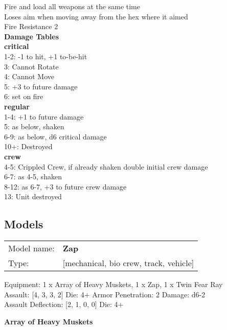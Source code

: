 Fire and load all weapons at the same time\\ 
Loses aim when moving away from the hex where it aimed\\ 
Fire Resistance 2\\ 



{\bf Damage Tables} \\
 {\bf critical } \\
1-2: -1 to hit, +1 to-be-hit \\
3: Cannot Rotate \\
4: Cannot Move \\
5: +3 to future damage \\
6: set on fire \\
 {\bf regular } \\
1-4: +1 to future damage \\
5: as below, shaken \\
6-9: as below, d6 critical damage \\
10+: Destroyed \\
 {\bf crew } \\
4-5: Crippled Crew, if already shaken double initial crew damage \\
6-7: as 4-5, shaken \\
8-12: as 6-7, +3 to future crew damage \\
13: Unit destroyed \\


\clearpage

\subsection{ Models }

\begin{tabular}{ll}
Model name: & {\bf Zap } \\
Type: & [mechanical, bio crew, track, vehicle] \\
\end{tabular}

Equipment: 1 x Array of Heavy Muskets, 1 x Zap, 1 x Twin Fear Ray \\

Assault: [4, 3, 3, 2] Die: 4+ Armor Penetration: 2 Damage: d6-2 \\
Assault Deflection: [2, 1, 0, 0] Die: 4+\\
\indent  



{\bf Array of Heavy Muskets } \\




